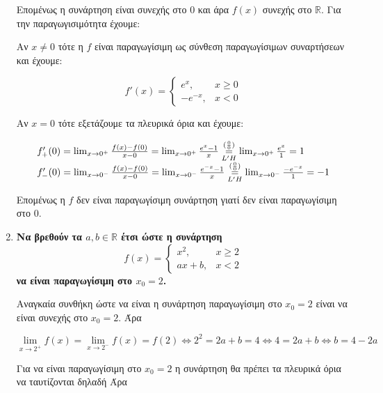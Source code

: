 \begin{enumerate}
\begin{solution}
		Επομένως η συνάρτηση είναι συνεχής στο 0 και άρα $ f(x) $ συνεχής στο $
		\mathbb{R} $.
		Για την παραγωγισιμότητα έχουμε:

		Αν $ x \neq 0 $ τότε η $f$ είναι παραγωγίσιμη ως σύνθεση παραγωγίσιμων
		συναρτήσεων και έχουμε:

		\[
			f'(x) = \begin{cases}
				e^{x}, & x\geq 0 \\
				-e^{-x}, & x < 0
			\end{cases}
		\]

		Αν $ x = 0 $ τότε εξετάζουμε τα πλευρικά όρια και έχουμε:

		\[
			\begin{tabular}{l}
			$f_{+}'(0) = \lim_{x\to 0^{+}} \frac{f(x) - f(0)}{x - 0} = \lim_{x \to
				0^{+}} \frac{e^{x} - 1}{x}
				\overset{(\frac{0}{0})}{\underset{L'H}{=}} \lim_{x\to 0^{+}}
			\frac{e^{x}}{1} = 1 $ \\
			$f_{-}'(0) = \lim_{x\to 0^{-}} \frac{f(x) - f(0)}{x - 0} =
			\lim_{x\to 0^{-}} \frac{e^{-x} - 1}{x} \overset{(\frac{0}{0})}{\underset{L'H}{=}}
			\lim_{x\to 0^{-}}
			\frac{-e^{-x}}{1} = -1 $
			\end{tabular}
		\]
		
		Επομένως η $f$ δεν είναι παραγωγίσιμη συνάρτηση γιατί δεν είναι
		παραγωγίσιμη στο 0.
    \end{solution}



	\item {\bfseries \boldmath Να βρεθούν τα $ a, b \in \mathbb{R} $ έτσι ώστε η συνάρτηση 
		\[
			f(x) = \begin{cases}
				x^{2}, & x\geq 2 \\
				ax+b , & x<2
			\end{cases}
		\]
	να είναι παραγωγίσιμη στο $ x_{0} = 2 $.}

  \begin{solution}
		Αναγκαία συνθήκη ώστε να είναι η συνάρτηση παραγωγίσιμη στο $ x_{0} = 2
		$ είναι να είναι συνεχής στο $ x_{0} = 2 $. Άρα

		\begin{equation}\label{eq:cont}
			\lim_{x\to 2^{+}} f(x) = \lim_{x\to 2^{-}} f(x) = f(2)
			\Leftrightarrow 2^{2} = 2a + b = 4 \Leftrightarrow 4 = 2a + b
			\Leftrightarrow b = 4 - 2a
		\end{equation}
		
		Για να είναι παραγωγίσιμη στο $ x_{0} = 2 $ η συνάρτηση θα πρέπει τα
		πλευρικά όρια να ταυτίζονται δηλαδή  Άρα


\end{solution}
\end{enumerate}
